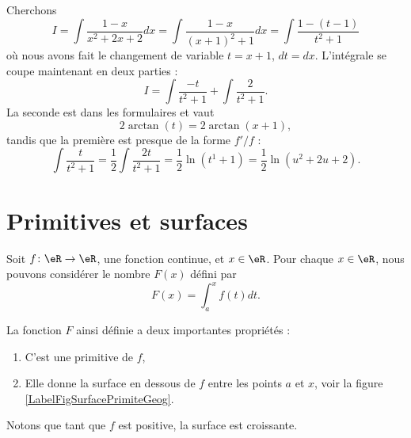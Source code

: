 Cherchons
\begin{equation}
	I=\int \frac{ 1-x }{ x^2+2x+2 }dx=\int\frac{ 1-x }{ (x+1)^2+1 }dx=\int\frac{ 1-(t-1) }{ t^2+1 }
\end{equation}
où nous avons fait le changement de variable $t=x+1$, $dt=dx$. L'intégrale se coupe maintenant en deux parties :
\begin{equation}
	I=\int\frac{ -t }{ t^2+1 }+\int \frac{ 2 }{ t^2+1 }.
\end{equation}
La seconde est dans les formulaires et vaut 
\begin{equation}
	2\arctan(t)=2\arctan(x+1),
\end{equation}
tandis que la première est presque de la forme $f'/f$ :
\begin{equation}
	\int\frac{ t }{ t^2+1 }=\frac{ 1 }{2}\int \frac{ 2t }{ t^2+1 }=\frac{ 1 }{2}\ln(t^1+1)=\frac{ 1 }{2}\ln(u^2+2u+2).
\end{equation}

					\section{Primitives et surfaces}

Soit $f\colon \eR\to \eR$, une fonction continue, et $x\in\eR$. Pour chaque $x\in\eR$, nous pouvons considérer le nombre $F(x)$ défini par
\begin{equation}
	F(x)=\int_a^x f(t)dt.
\end{equation}


\newcommand{\CaptionFigSurfacePrimiteGeog}{Surface sous une courbe.}


La fonction $F$ ainsi définie a deux importantes propriétés :
\begin{enumerate}

\item
C'est une primitive de $f$,
\item
Elle donne la surface en dessous de $f$ entre les points $a$ et $x$, voir la figure \ref{LabelFigSurfacePrimiteGeog}.

\end{enumerate}

Notons que tant que $f$ est positive, la surface est croissante.

